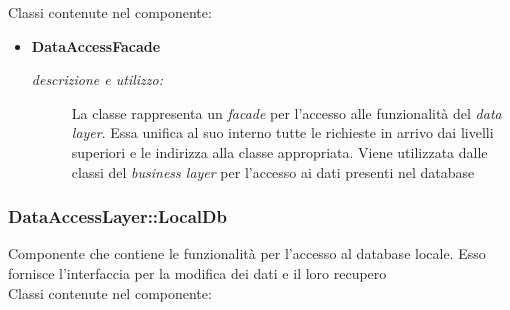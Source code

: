 Classi contenute nel componente: 
\begin{itemize} 
\item \textbf{DataAccessFacade}
\begin{description}
\item [\textit{descrizione e utilizzo:}] La classe rappresenta un \textit{facade} per l'accesso alle funzionalità del \textit{data layer}. Essa unifica al suo interno tutte le richieste in arrivo dai livelli superiori e le indirizza alla classe appropriata. Viene utilizzata dalle classi del \textit{business layer} per l'accesso ai dati presenti nel database
\end{description}
\end{itemize}

\subsubsection{DataAccessLayer::LocalDb} \label{sec:c3.2}
Componente che contiene le funzionalità per l'accesso al database locale. Esso fornisce l'interfaccia per la modifica dei dati e il loro recupero\\
Classi contenute nel componente: 
